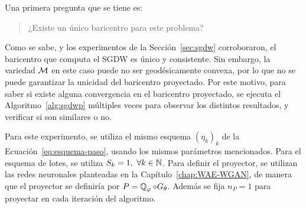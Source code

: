 Una primera pregunta que se tiene es:
\begin{quotation}
    \centering
    ¿Existe un único baricentro para este problema?
\end{quotation}
Como se sabe, y los experimentos de la Sección~\ref{sec:sgdw} corroboraron, el baricentro que computa el SGDW es único y consistente. Sin embargo, la variedad $\operatorname{\mathcal{M}}$ en este caso puede no ser geodésicamente convexa, por lo que no se puede garantizar la unicidad del baricentro proyectado. Por este motivo, para saber si existe alguna convergencia en el baricentro proyectado, se ejecuta el Algoritmo~\ref{alg:sgdwp} múltiples veces para observar los distintos resultados, y verificar si son similares o no.

Para este experimento, se utiliza el mismo esquema $(\eta_k)_k$ de la Ecuación~\ref{eq:esquema-paso}, usando los mismos parámetros mencionados. Para el esquema de lotes, se utiliza $S_k=1,\ \forall k \in \mathbb{N}$. Para definir el proyector, se utilizan las redes neuronales planteadas en la Capítulo~\ref{chap:WAE-WGAN}, de manera que el proyector se definiría por $P = \ProbQ_\varphi \circ G_\theta$. Además se fija $n_P=1$ para proyectar en cada iteración del algoritmo.

